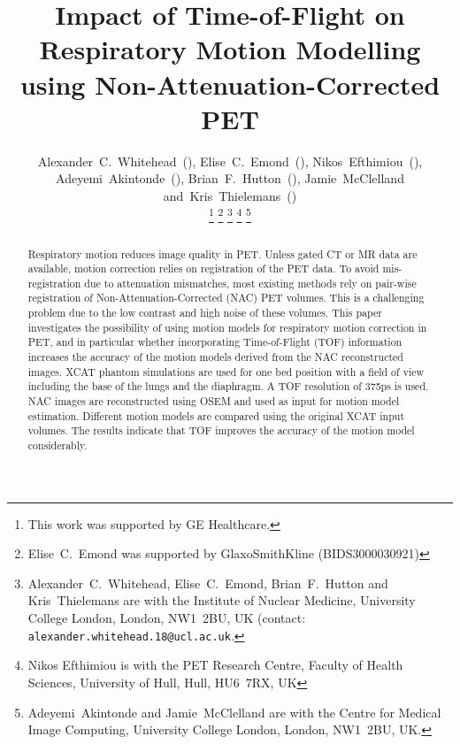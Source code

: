 \documentclass{IEEEtran}
\begin{document}
\title{Impact of Time-of-Flight on Respiratory Motion Modelling using Non-Attenuation-Corrected PET}
\author{Alexander~C.~Whitehead~(),
        Elise~C.~Emond~(),
        Nikos~Efthimiou~(),
        Adeyemi~Akintonde~(),
        Brian~F.~Hutton~(),
        Jamie~McClelland
        and~Kris~Thielemans~()%

    \thanks{This work was supported by GE Healthcare.}%
    \thanks{Elise~C.~Emond was supported by GlaxoSmithKline (BIDS3000030921)}
    \thanks{Alexander~C.~Whitehead, Elise~C.~Emond, Brian~F.~Hutton and Kris~Thielemans are with the Institute of Nuclear Medicine, University College London, London, NW1~2BU, UK (contact: \texttt{alexander.whitehead.18@ucl.ac.uk}.}%
    \thanks{Nikos Efthimiou is with the PET Research Centre, Faculty of Health Sciences, University of Hull, Hull, HU6~7RX, UK}%
    \thanks{Adeyemi~Akintonde and Jamie~McClelland are with the Centre for Medical Image Computing, University College London, London, NW1~2BU, UK.}%
}

\maketitle
\vspace{-1cm}

\IEEEpeerreviewmaketitle
\begin{abstract}
Respiratory motion reduces image quality in PET. Unless gated CT or MR data are available, motion correction relies on registration of the PET data. To avoid mis-registration due to attenuation mismatches, most existing methods rely on pair-wise registration of Non-Attenuation-Corrected (NAC) PET volumes. This is a challenging problem due to the low contrast and high noise of these volumes. This paper investigates the possibility of using motion models for respiratory motion correction in PET, and in particular whether incorporating Time-of-Flight (TOF) information increases the accuracy of the motion models derived from the NAC reconstructed images. XCAT phantom simulations are used for one bed position with a field of view including the base of the lungs and the diaphragm. A TOF resolution of 375ps is used. NAC images are reconstructed using OSEM and used as input for motion model estimation. Different motion models are compared using the original XCAT input volumes. The results indicate that TOF improves the accuracy of the motion model considerably.

\end{abstract}
\end{document}
